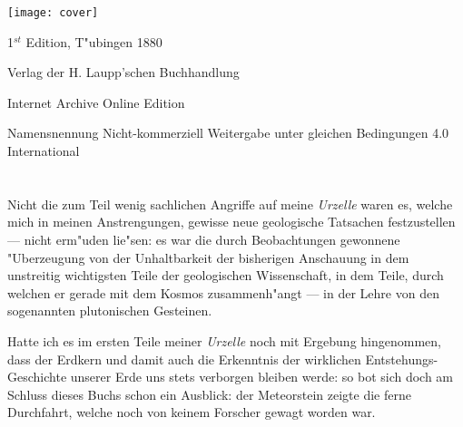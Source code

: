 \documentclass[a4paper, 11pt, oneside]{article}
\begin{document}
\begin{titlepage}
	\texttt{[image: cover]}
	
		
	\vspace*{\fill}%
	
	1$^{st}$ Edition, T"ubingen 1880 %
	
	{\small Verlag der H. Laupp'schen Buchhandlung } %

	\vspace{1\baselineskip} %

    Internet Archive Online Edition  %
	
	{\small Namensnennung Nicht-kommerziell Weitergabe unter gleichen Bedingungen 4.0 International } %
\end{titlepage}
\setlength{\parskip}{1mm plus1mm minus1mm}
\setcounter{tocdepth}{2}
\setcounter{secnumdepth}{3}
\pagestyle{fancy}
\fancyhf{}
\cfoot{\frakfamily{\thepage}}
\tableofcontents
\clearpage
\listoffigures
\clearpage
\LARGE
\section{}
\subsection{}
\paragraph{}
Nicht die zum Teil wenig sachlichen Angriffe auf meine \emph{Urzelle} waren es, welche mich in meinen Anstrengungen, gewisse neue geologische Tatsachen festzustellen --- nicht erm"uden lie"sen: es war die durch Beobachtungen gewonnene "Uberzeugung von der Unhaltbarkeit der bisherigen Anschauung in dem unstreitig wichtigsten Teile der geologischen Wissenschaft, in dem Teile, durch welchen er gerade mit dem Kosmos zusammenh"angt --- in der Lehre von den sogenannten plutonischen Gesteinen.

Hatte ich es im ersten Teile meiner \emph{Urzelle} noch mit Ergebung hingenommen, dass der Erdkern und damit auch die Erkenntnis der wirklichen Entstehungs-Geschichte unserer Erde uns stets verborgen bleiben werde: so bot sich doch am Schluss dieses Buchs schon ein Ausblick: der Meteorstein zeigte die ferne Durchfahrt, welche noch von keinem Forscher gewagt worden war.
\end{document}
